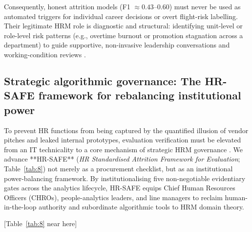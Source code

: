 \documentclass[12pt,a4paper]{article}
\begin{document}
Consequently, honest attrition models (F1 $\approx 0.43\text{--}0.60$) must never be used as automated triggers for individual career decisions or overt flight-risk labelling. Their legitimate HRM role is diagnostic and structural: identifying unit-level or role-level risk patterns (e.g., overtime burnout or promotion stagnation across a department) to guide supportive, non-invasive leadership conversations and working-condition reviews \parencite{ref45,ref54}.

\subsection{Strategic algorithmic governance: The HR-SAFE framework for rebalancing institutional power}
\label{sec:hrsafe}
To prevent HR functions from being captured by the quantified illusion of vendor pitches and leaked internal prototypes, evaluation verification must be elevated from an IT technicality to a core mechanism of strategic HRM governance \parencite{ref56,ref51,ref53}. We advance **HR-SAFE** (\textit{HR Standardised Attrition Framework for Evaluation}; Table~\ref{tab:8}) not merely as a procurement checklist, but as an institutional power-balancing framework. By institutionalising five non-negotiable evidentiary gates across the analytics lifecycle, HR-SAFE equips Chief Human Resources Officers (CHROs), people-analytics leaders, and line managers to reclaim human-in-the-loop authority \parencite{ref54,ref61} and subordinate algorithmic tools to HRM domain theory.

\begin{center}
[Table~\ref{tab:8} near here]
\end{center}
\end{document}
